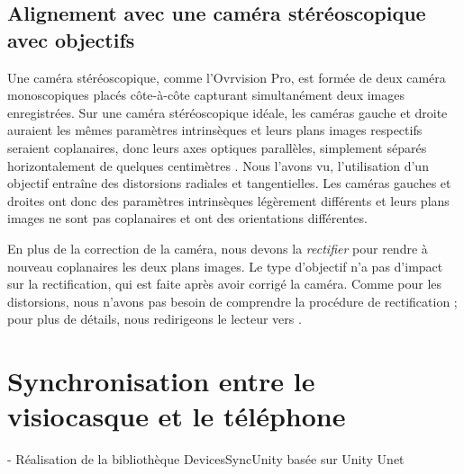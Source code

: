 
\subsection{Alignement avec une caméra stéréoscopique avec objectifs }
\label{subsec:stereo_camera_calibration}

Une caméra stéréoscopique, comme l'Ovrvision Pro, est formée de deux caméra monoscopiques placés côte-à-côte capturant simultanément deux images enregistrées. Sur une caméra stéréoscopique idéale, les caméras gauche et droite auraient les mêmes paramètres intrinsèques et leurs plans images respectifs seraient coplanaires, donc leurs axes optiques parallèles, simplement séparés horizontalement de quelques centimètres . Nous l'avons vu, l'utilisation d'un objectif entraîne des distorsions radiales et tangentielles. Les caméras gauches et droites ont donc des paramètres intrinsèques légèrement différents et leurs plans images ne sont pas coplanaires et ont des orientations différentes.


En plus de la correction de la caméra, nous devons la \emph{rectifier} pour rendre à nouveau coplanaires les deux plans images. Le type d'objectif n'a pas d'impact sur la rectification, qui est faite après avoir corrigé la caméra. Comme pour les distorsions, nous n'avons pas besoin de comprendre la procédure de rectification ; pour plus de détails, nous redirigeons le lecteur vers \cite[p. 419]{Bradski2008}.


\section{Synchronisation entre le visiocasque et le téléphone}
\label{sec:synchronization}
- Réalisation de la bibliothèque DevicesSyncUnity basée sur Unity Unet


